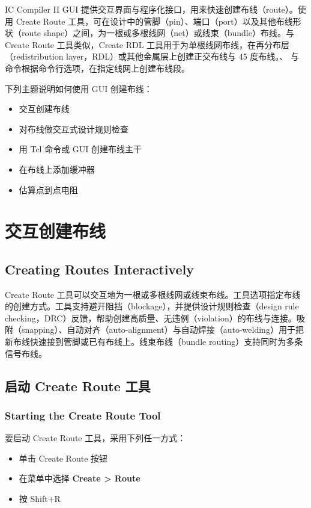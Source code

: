 \label{chap:gui-route}

IC Compiler II GUI 提供交互界面与程序化接口，用来快速创建布线（route）。使用 Create Route 工具，可在设计中的管脚（pin）、端口（port）以及其他布线形状（route shape）之间，为一根或多根线网（net）或线束（bundle）布线。与 Create Route 工具类似，Create RDL 工具用于为单根线网布线，在再分布层（redistribution layer，RDL）或其他金属层上创建正交布线与 45 度布线。、 与  命令根据命令行选项，在指定线网上创建布线段。

下列主题说明如何使用 GUI 创建布线：
\begin{itemize}
  \item 交互创建布线
  \item 对布线做交互式设计规则检查
  \item 用 Tcl 命令或 GUI 创建布线主干
  \item 在布线上添加缓冲器
  \item 估算点到点电阻
\end{itemize}

\section{交互创建布线}
\subsection*{Creating Routes Interactively}

Create Route 工具可以交互地为一根或多根线网或线束布线。工具选项指定布线的创建方式。工具支持避开阻挡（blockage），并提供设计规则检查（design rule checking，DRC）反馈，帮助创建高质量、无违例（violation）的布线与连接。吸附（snapping）、自动对齐（auto-alignment）与自动焊接（auto-welding）用于把新布线快速接到管脚或已有布线上。线束布线（bundle routing）支持同时为多条信号布线。

\subsection{启动 Create Route 工具}
\subsubsection*{Starting the Create Route Tool}

要启动 Create Route 工具，采用下列任一方式：
\begin{itemize}
  \item 单击 Create Route 按钮
  \item 在菜单中选择 \textbf{Create > Route}
  \item 按 Shift+R
\end{itemize}

